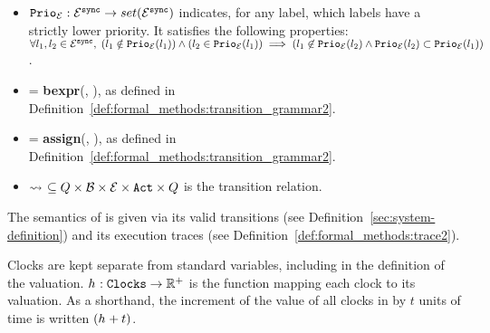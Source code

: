 \begin{definition}
\begin{itemize}
\item
   $\text{\texttt{Prio}\textsubscript{\ensuremath{\mathcal{E}}}}{}:
      \mathcal{E}{}^{\texttt{sync}}
      \to set(\mathcal{E}{}^{\texttt{sync}})$
   indicates, for any label, which labels have a strictly lower priority. It satisfies the following properties:
   $\forallin{l_1,l_2}{\automatachanlabels{}^{\texttt{sync}}}{%
      (l_1 \notin \automatachanpriorities{}(l_1)) \land (l_2 \in \automatachanpriorities{}(l_1))
      \implies
      (
         l_1 \not\in \automatachanpriorities{}(l_2)
         \land
         \automatachanpriorities{}(l_2) \subset \automatachanpriorities{}(l_1)
      )
   }
   $.
\item
   \automatacondlabels{} = \textbf{bexpr}(\automatavariables{},
   \automataclocks{}), as defined in
   Definition~\ref{def:formal_methods:transition_grammar2}.
\item
   \automataactionlabels{} = \textbf{assign}(\automatavariables{},
   \automataclocks{}), as defined in
   Definition~\ref{def:formal_methods:transition_grammar2}.
\item
   ${\rightsquigarrow{}\!}{} \subseteq
      Q{}
      \times \mathcal{B}{}
      \times \mathcal{E}{}
      \times \text{\texttt{Act}}{}
      \times Q{}
   $ is the transition relation.
\end{itemize}
The semantics of \automatasystem{} is given via its valid transitions
(see Definition~\ref{sec:system-definition}) and its execution traces
(see Definition~\ref{def:formal_methods:trace2}).
\end{definition}

\begin{definition}
Clocks are kept separate from standard variables, including in the definition of
the valuation. $h_{}: \text{\texttt{Clocks}} \to \mathbb{R}^+$ is the
function mapping each clock to its valuation. As a shorthand, the increment
of the value of all clocks in \automataclockvals{} by $t$ units of time is
written $(h_{} + t)$.
\end{definition}

